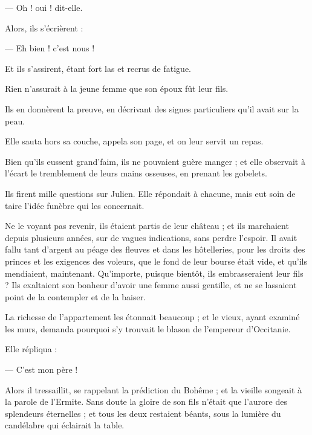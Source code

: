 \documentclass[]{book}
\begin{document}
                — Oh ! oui ! dit-elle.
                    
                Alors, ils s'écrièrent :
                    
                — Eh bien ! c'est nous !
                    
                Et ils s'assirent, étant fort las et recrus de fatigue.
                    
                Rien n'assurait à la jeune femme que son époux fût leur fils.
                    
                Ils en donnèrent la preuve, en décrivant des signes particuliers qu'il avait sur la peau.
                    
                Elle sauta hors sa couche, appela son page, et on leur servit un repas.
                    
                Bien qu'ils eussent grand'faim, ils ne pouvaient guère manger ; et elle observait à l'écart le tremblement de leurs mains osseuses, en prenant les gobelets.
                    
                Ils firent mille questions sur Julien. Elle répondait à chacune, mais eut soin de taire l'idée funèbre qui les concernait.
                    
                Ne le voyant pas revenir, ils étaient partis de leur château ; et ils marchaient depuis plusieurs années, sur de vagues indications, sans perdre l'espoir. Il avait fallu tant d'argent au péage des fleuves et dans les hôtelleries, pour les droits des princes et les exigences des voleurs, que le fond de leur bourse était vide, et qu'ils mendiaient, maintenant. Qu'importe, puisque bientôt, ils embrasseraient leur fils ? Ils exaltaient son bonheur d'avoir une femme aussi gentille, et ne se lassaient point de la contempler et de la baiser.
                    
                La richesse de l'appartement les étonnait beaucoup ; et le vieux, ayant examiné les murs, demanda pourquoi s'y trouvait le blason de l'empereur d'Occitanie.
                    
                Elle répliqua :
                    
                — C'est mon père !
                    
                Alors il tressaillit, se rappelant la prédiction du Bohême ; et la vieille songeait à la parole de l'Ermite. Sans doute la gloire de son fils n'était que l'aurore des splendeurs éternelles ; et tous les deux restaient béants, sous la lumière du candélabre qui éclairait la table.
                    
\end{document}
